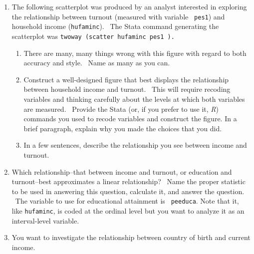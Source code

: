 \documentclass[11pt]{article}
\begin{document}
\begin{enumerate}
\item The following scatterplot was produced by an analyst interested in
exploring the relationship between turnout (measured with variable \texttt{%
pes1}) and household income (\texttt{hufaminc}). \ The Stata command
generating the scatterplot was \texttt{twoway (scatter hufaminc pes1 ).}%
\bigskip


\begin{enumerate}
\item There are many, many things wrong with this figure with regard to both
accuracy and style. \ Name as many as you can.\bigskip

\item Construct a well-designed figure that best displays the relationship
between household income and turnout. \ This will require recoding variables
and thinking carefully about the levels at which both variables are
measured. \ Provide the Stata (or, if you prefer to use it, \textit{R})
commands you used to recode variables and construct the figure. In a brief
paragraph, explain why you made the choices that you did.\bigskip

\item In a few sentences, describe the relationship you see between income
and turnout.\bigskip
\end{enumerate}

\item Which relationship--that between income and turnout, or education and
turnout--best approximates a linear relationship? \ Name the proper
statistic to be used in answering this question, calculate it, and answer
the question. \ The variable to use for educational attainment is \texttt{%
peeduca}. Note that it, like \texttt{hufaminc}, is coded at the ordinal
level but you want to analyze it as an interval-level variable. \ \bigskip

\item You want to investigate the relationship between country of birth and
current income. \ 


\end{enumerate}
\end{document}
